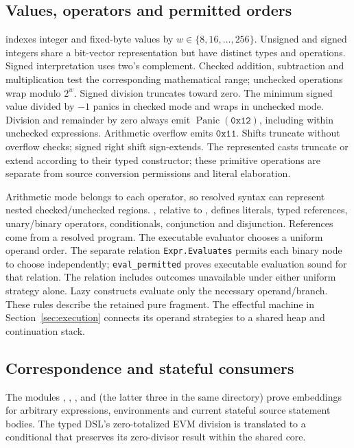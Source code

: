 \documentclass[conference]{IEEEtran}
\newcommand{\code}[1]{\texttt{#1}}
\begin{document}
\subsection{Values, operators and permitted orders}
 indexes integer and fixed-byte values by
$w\in\{8,16,\ldots,256\}$. Unsigned and signed integers share a bit-vector
representation but have distinct types and operations. Signed interpretation
uses two's complement. Checked addition, subtraction and multiplication test
the corresponding mathematical range; unchecked operations wrap modulo $2^w$.
Signed division truncates toward zero. The minimum signed value divided by
$-1$ panics in checked mode and wraps in unchecked mode. Division and remainder
by zero always emit $\operatorname{Panic}(\mathtt{0x12})$, including within
unchecked expressions. Arithmetic overflow emits $\mathtt{0x11}$.
Shifts truncate without overflow checks; signed right shift sign-extends.
The represented casts truncate or extend according to their typed constructor;
these primitive operations are separate from source conversion permissions
and literal elaboration.

Arithmetic mode belongs to each operator, so resolved syntax can represent
nested checked/unchecked regions. , relative to
, defines literals, typed references, unary/binary operators,
conditionals, conjunction and disjunction. References come from a resolved
program. The executable evaluator chooses a uniform operand order.
The separate relation \code{Expr.Evaluates} permits each binary node to choose
independently; \code{eval\_permitted} proves executable evaluation sound for that
relation. The relation includes outcomes unavailable under either uniform
strategy alone. Lazy constructs evaluate only the necessary operand/branch.
These rules describe the retained pure fragment. The effectful machine in
Section~\ref{sec:execution} connects its operand strategies to a shared heap
and continuation stack.

\subsection{Correspondence and stateful consumers}
The modules ,
, , and 
(the latter three in the same directory) prove embeddings for arbitrary
expressions, environments and current stateful source statement bodies.
The typed DSL's zero-totalized EVM division is translated to a conditional that
preserves its zero-divisor result within the shared core.
\end{document}
